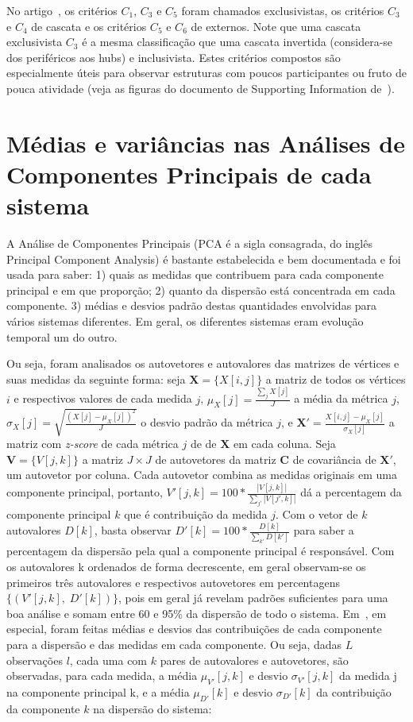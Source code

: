 \documentclass[a4paper,openright,12pt]{report} %
\begin{document}
No artigo~\cite{timeS}, os critérios $C_1$, $C_3$ e $C_5$ foram chamados exclusivistas, os critérios $C_3$ e $C_4$ de cascata e os critérios $C_5$ e $C_6$ de externos. Note que uma cascata exclusivista $C_3$ é a mesma classificação que uma cascata invertida (considera-se dos periféricos aos hubs) e inclusivista. Estes critérios compostos são especialmente úteis para observar estruturas com poucos participantes ou fruto de pouca atividade (veja as figuras do documento de Supporting Information de~\cite{timeS}).

\section{Médias e variâncias nas Análises de Componentes Principais de cada sistema}\label{sec:pca}
A Análise de Componentes Principais (PCA é a sigla consagrada, do inglês Principal Component Analysis) é bastante estabelecida e bem documentada
e foi usada para saber: 
1) quais as medidas que contribuem para cada componente principal e em que proporção;
2) quanto da dispersão está concentrada em cada componente.
3) médias e desvios padrão destas quantidades envolvidas para vários
sistemas diferentes. Em geral, os diferentes sistemas eram evolução
temporal um do outro.

Ou seja, foram analisados os autovetores e autovalores das matrizes
de vértices e suas medidas da seguinte forma: seja $\mathbf{X}=\{X[i,j]\}$
a matriz de todos os vértices $i$ e respectivos valores de cada medida $j$, 
$\mu_X [j]=\frac{\sum_j X[j]}{J}$ a média da métrica $j$, 
$\sigma_X [j]=\sqrt{\frac{(X[j]-\mu_X [j])^2}{J}}$ o desvio padrão da métrica $j$,
e $\mathbf{X'}={\frac{X[i,j]-\mu_X[j]}{\sigma_X[j]}}$ a matriz com \emph{z-score} de cada métrica $j$ de de $\mathbf{X}$ em cada coluna. 
Seja $\mathbf{V}=\{V[j,k]\}$ a matriz $J\times J$ de autovetores da matriz $\mathbf{C}$ de covariância
de $\mathbf{X'}$, um autovetor por coluna.
Cada autovetor combina as medidas originais em uma componente principal, portanto, $V'[j,k]=100*\frac{|V[j,k]|}{\sum_{j'} |V[j',k]|}$
dá a percentagem da componente principal $k$
que é contribuição da medida $j$.
Com o vetor de $k$ autovalores $D[k]$,
basta observar $D'[k]=100*\frac{D[k]}{\sum_{k'}D[k']}$ para saber
a percentagem da dispersão pela qual a componente principal é responsável.
Com os autovalores k ordenados de forma decrescente, 
em geral observam-se os primeiros três autovalores e respectivos
autovetores em percentagens $\{(V'[j,k],\;D'[k])\}$, pois em geral
já revelam padrões suficientes para uma boa análise e somam entre 60 e 95\% da dispersão de todo o sistema.
Em~\cite{timeS}, em especial, foram feitas médias e desvios das contribuições de cada componente para a dispersão e das medidas em cada componente. Ou seja, dadas $L$ observações $l$, cada uma com $k$ pares de autovalores e autovetores, são observadas, para cada medida,
a média $\mu_{V'}[j,k]$ e desvio $\sigma_{V'}[j,k]$ 
da medida j na componente principal k,
e a média $\mu_{D'}[k]$ e desvio $\sigma_{D'}[k]$ da 
contribuição da componente $k$ na dispersão do sistema:
\end{document}
